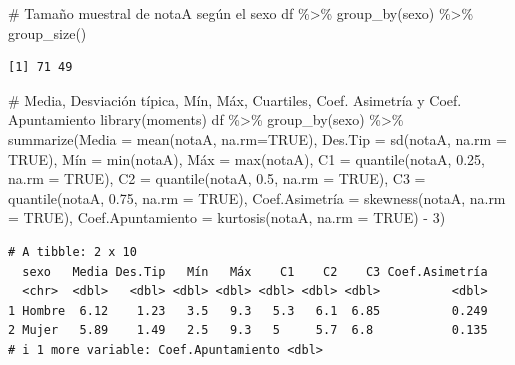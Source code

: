 \documentclass[
  a4paper,
]{scrreport}
\newenvironment{Shaded}{\begin{snugshade}}{\end{snugshade}}
\newcommand{\AttributeTok}[1]{\textcolor[rgb]{0.40,0.45,0.13}{#1}}
\newcommand{\CommentTok}[1]{\textcolor[rgb]{0.37,0.37,0.37}{#1}}
\newcommand{\ConstantTok}[1]{\textcolor[rgb]{0.56,0.35,0.01}{#1}}
\newcommand{\DecValTok}[1]{\textcolor[rgb]{0.68,0.00,0.00}{#1}}
\newcommand{\FloatTok}[1]{\textcolor[rgb]{0.68,0.00,0.00}{#1}}
\newcommand{\FunctionTok}[1]{\textcolor[rgb]{0.28,0.35,0.67}{#1}}
\newcommand{\NormalTok}[1]{\textcolor[rgb]{0.00,0.23,0.31}{#1}}
\newcommand{\OtherTok}[1]{\textcolor[rgb]{0.00,0.23,0.31}{#1}}
\newcommand{\SpecialCharTok}[1]{\textcolor[rgb]{0.37,0.37,0.37}{#1}}
\theoremstyle{definition}
\theoremstyle{definition}
\theoremstyle{remark}
\begin{document}
\begin{Shaded}
\begin{Highlighting}[]
\CommentTok{\# Tamaño muestral de notaA según el sexo}
\NormalTok{df }\SpecialCharTok{\%\textgreater{}\%} \FunctionTok{group\_by}\NormalTok{(sexo) }\SpecialCharTok{\%\textgreater{}\%} \FunctionTok{group\_size}\NormalTok{()}
\end{Highlighting}
\end{Shaded}

\begin{verbatim}
[1] 71 49
\end{verbatim}

\begin{Shaded}
\begin{Highlighting}[]
\CommentTok{\# Media, Desviación típica, Mín, Máx, Cuartiles, Coef. Asimetría y Coef. Apuntamiento}
\FunctionTok{library}\NormalTok{(moments)}
\NormalTok{df }\SpecialCharTok{\%\textgreater{}\%} \FunctionTok{group\_by}\NormalTok{(sexo) }\SpecialCharTok{\%\textgreater{}\%} \FunctionTok{summarize}\NormalTok{(}\AttributeTok{Media =} \FunctionTok{mean}\NormalTok{(notaA, }\AttributeTok{na.rm=}\ConstantTok{TRUE}\NormalTok{), }\AttributeTok{Des.Tip =} \FunctionTok{sd}\NormalTok{(notaA, }\AttributeTok{na.rm =} \ConstantTok{TRUE}\NormalTok{), Mín }\OtherTok{=} \FunctionTok{min}\NormalTok{(notaA), Máx }\OtherTok{=} \FunctionTok{max}\NormalTok{(notaA), }\AttributeTok{C1 =} \FunctionTok{quantile}\NormalTok{(notaA, }\FloatTok{0.25}\NormalTok{, }\AttributeTok{na.rm =} \ConstantTok{TRUE}\NormalTok{), }\AttributeTok{C2 =} \FunctionTok{quantile}\NormalTok{(notaA, }\FloatTok{0.5}\NormalTok{, }\AttributeTok{na.rm =} \ConstantTok{TRUE}\NormalTok{), }\AttributeTok{C3 =} \FunctionTok{quantile}\NormalTok{(notaA, }\FloatTok{0.75}\NormalTok{, }\AttributeTok{na.rm =} \ConstantTok{TRUE}\NormalTok{), Coef.Asimetría }\OtherTok{=} \FunctionTok{skewness}\NormalTok{(notaA, }\AttributeTok{na.rm =} \ConstantTok{TRUE}\NormalTok{), }\AttributeTok{Coef.Apuntamiento =} \FunctionTok{kurtosis}\NormalTok{(notaA, }\AttributeTok{na.rm =} \ConstantTok{TRUE}\NormalTok{) }\SpecialCharTok{{-}} \DecValTok{3}\NormalTok{)}
\end{Highlighting}
\end{Shaded}

\begin{verbatim}
# A tibble: 2 x 10
  sexo   Media Des.Tip   Mín   Máx    C1    C2    C3 Coef.Asimetría
  <chr>  <dbl>   <dbl> <dbl> <dbl> <dbl> <dbl> <dbl>          <dbl>
1 Hombre  6.12    1.23   3.5   9.3   5.3   6.1  6.85          0.249
2 Mujer   5.89    1.49   2.5   9.3   5     5.7  6.8           0.135
# i 1 more variable: Coef.Apuntamiento <dbl>
\end{verbatim}
\end{document}
